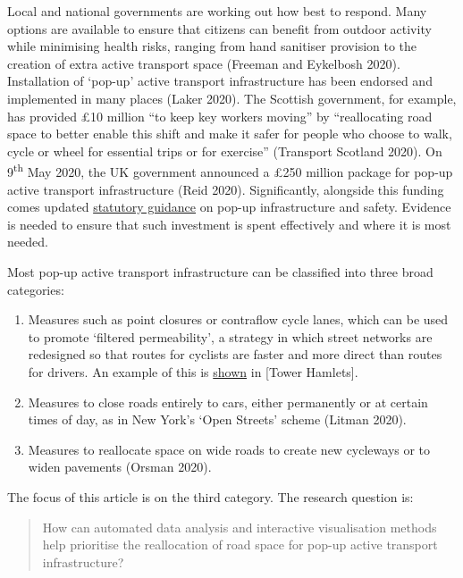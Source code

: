 \documentclass[
]{article}
\providecommand{\tightlist}{%
  \setlength{\itemsep}{0pt}\setlength{\parskip}{0pt}}
\begin{document}
Local and national governments are working out how best to respond.
Many options are available to ensure that citizens can benefit from outdoor activity while minimising health risks, ranging from hand sanitiser provision to the creation of extra active transport space (Freeman and Eykelbosh 2020).
Installation of `pop-up' active transport infrastructure has been endorsed and implemented in many places (Laker 2020).
The Scottish government, for example, has provided £10 million ``to keep key workers moving'' by ``reallocating road space to better enable this shift and make it safer for people who choose to walk, cycle or wheel for essential trips or for exercise'' (Transport Scotland 2020).
On 9\textsuperscript{th} May 2020, the UK government announced a £250 million package for pop-up active transport infrastructure (Reid 2020).
Significantly, alongside this funding comes updated \href{https://www.gov.uk/government/publications/reallocating-road-space-in-response-to-covid-19-statutory-guidance-for-local-authorities/traffic-management-act-2004-network-management-in-response-to-covid-19}{statutory guidance} on pop-up infrastructure and safety.
Evidence is needed to ensure that such investment is spent effectively and where it is most needed.

Most pop-up active transport infrastructure can be classified into three broad categories:

\begin{enumerate}
\def\labelenumi{\arabic{enumi}.}
\tightlist
\item
  Measures such as point closures or contraflow cycle lanes, which can be used to promote `filtered permeability', a strategy in which street networks are redesigned so that routes for cyclists are faster and more direct than routes for drivers. An example of this is \href{https://twitter.com/TowerHamletsNow/status/1257564043856019458}{shown} in {[}Tower Hamlets{]}.
\item
  Measures to close roads entirely to cars, either permanently or at certain times of day, as in New York's `Open Streets' scheme (Litman 2020).
\item
  Measures to reallocate space on wide roads to create new cycleways or to widen pavements (Orsman 2020).
\end{enumerate}

The focus of this article is on the third category.
The research question is:

\begin{quote}
How can automated data analysis and interactive visualisation methods help prioritise the reallocation of road space for pop-up active transport infrastructure?
\end{quote}
\end{document}

